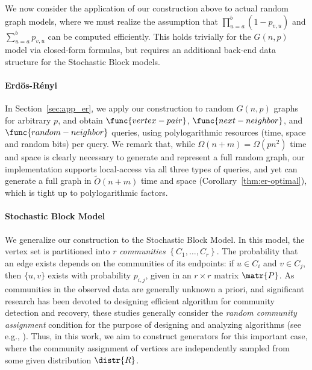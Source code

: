 We now consider the application of our construction above to actual random graph models,
where we must realize the assumption that $\prod^{b}_{u=a} (1-p_{v,u})$
and $\sum^{b}_{u=a} p_{v,u}$ can be computed efficiently.
This holds trivially for the $G(n,p)$ model via closed-form formulas,
but requires an additional back-end data structure for the Stochastic Block models.

\paragraph{Erd\"{o}s-R\'{e}nyi}
\label{par:erdos_renyi}
In Section~\ref{sec:app_er}, we apply our construction to random $G(n,p)$ graphs for
arbitrary $p$, and obtain
$\func{vertex-pair}$, $\func{next-neighbor}$, and $\func{random-neighbor}$ queries,
using polylogarithmic resources (time, space and random bits) per query.
We remark that, while $\Omega(n+m) = \Omega(p n^2)$ time and space
is clearly necessary to generate and represent a full random graph,
our implementation supports local-access via all three types of queries, 
and yet can generate a full graph in $\widetilde{O}(n+m)$ time and space (Corollary~\ref{thm:er-optimal}),
which is tight up to polylogarithmic factors.

\paragraph{Stochastic Block Model}
\label{par:stochastic_block_model}
We generalize our construction to the Stochastic Block Model.
In this model, the vertex set is partitioned into $r$ \emph{communities}
$\left\{ C_1, \ldots, C_r \right\}$.
The probability that an edge exists depends on the communities of its endpoints:
if $u\in C_i$ and $v \in C_j$, then $\{u,v\}$ exists with probability $p_{i,j}$,
given in an $r\times r$ matrix $\matr{P}$.
As communities in the observed data are generally unknown a priori,
and significant research has been devoted to designing efficient algorithm
for community detection and recovery,
these studies generally consider the \emph{random community assignment} condition for the purpose of designing and analyzing algorithms (see e.g., \cite{mossel2015reconstruction}).
Thus, in this work, we aim to construct generators for this important case, where the community assignment of vertices are independently sampled from some given distribution $\distr{R}$.

